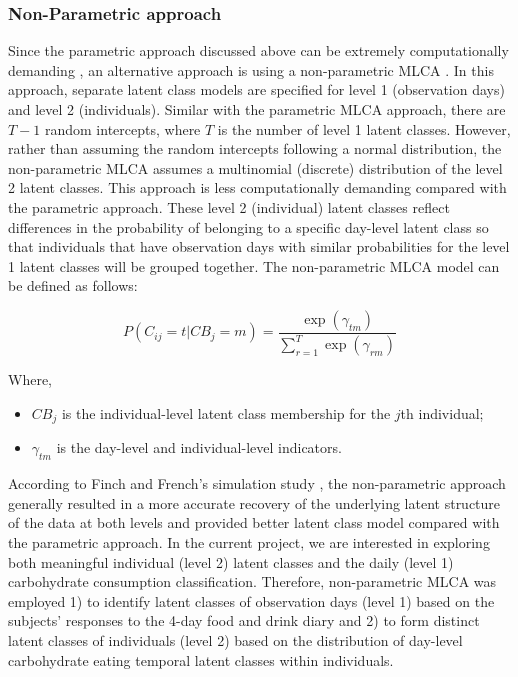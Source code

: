 \vspace{-0.5cm}
\subsubsection{Non-Parametric approach}\vspace{-0.3cm}


Since the parametric approach discussed above can be extremely computationally demanding \parencite{van2008using, vermunt2008latent}, an alternative approach is using a non-parametric MLCA \parencite{davidian2008growth}. In this approach, separate latent class models are specified for level 1 (observation days) and level 2 (individuals). Similar with the parametric MLCA approach, there are $T-1$ random intercepts, where $T$ is the number of level 1 latent classes. However, rather than assuming the random intercepts following a normal distribution, the non-parametric MLCA assumes a multinomial (discrete) distribution of the level 2 latent classes. This approach is less computationally demanding compared with the parametric approach. These level 2 (individual) latent classes reflect differences in the probability of belonging to a specific day-level latent class so that individuals that have observation days with similar probabilities for the level 1 latent classes will be grouped together. The non-parametric MLCA model can be defined as follows: 

\begin{equation}
P(C_{ij} = t | CB_j = m)  = \frac{\exp(\gamma_{tm})}{\sum_{r=1}^{T}\exp(\gamma_{rm})}
\end{equation}

Where, 

\begin{itemize}
	\item $CB_j$ is the individual-level latent class membership for the $j$th individual;
	\item $\gamma_{tm}$ is the day-level and individual-level indicators. 
\end{itemize}

According to Finch and French's simulation study \parencite{finch2014multilevel}, the non-parametric approach generally resulted in a more accurate recovery of the underlying latent structure of the data at both levels and provided better latent class model compared with the parametric approach. In the current project, we are interested in exploring both meaningful individual (level 2) latent classes and the daily (level 1) carbohydrate consumption classification. Therefore, non-parametric MLCA was employed 1) to identify latent classes of observation days (level 1) based on the subjects' responses to the 4-day food and drink diary and 2) to form distinct latent classes of individuals (level 2) based on the distribution of day-level carbohydrate eating temporal latent classes within individuals.\vspace{-0.3cm}
 

